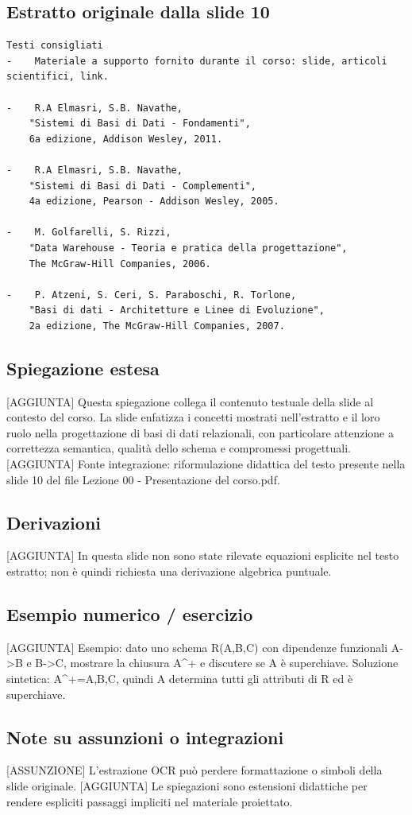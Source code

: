 \documentclass[11pt]{article}
\begin{document}
\subsection*{Estratto originale dalla slide 10}
\begin{lstlisting}
Testi consigliati
-    Materiale a supporto fornito durante il corso: slide, articoli scientifici, link.

-    R.A Elmasri, S.B. Navathe,
    "Sistemi di Basi di Dati - Fondamenti",
    6a edizione, Addison Wesley, 2011.

-    R.A Elmasri, S.B. Navathe,
    "Sistemi di Basi di Dati - Complementi",
    4a edizione, Pearson - Addison Wesley, 2005.

-    M. Golfarelli, S. Rizzi,
    "Data Warehouse - Teoria e pratica della progettazione",
    The McGraw-Hill Companies, 2006.

-    P. Atzeni, S. Ceri, S. Paraboschi, R. Torlone,
    "Basi di dati - Architetture e Linee di Evoluzione",
    2a edizione, The McGraw-Hill Companies, 2007.
\end{lstlisting}
\subsection*{Spiegazione estesa}
[AGGIUNTA] Questa spiegazione collega il contenuto testuale della slide al contesto del corso. La slide enfatizza i concetti mostrati nell'estratto e il loro ruolo nella progettazione di basi di dati relazionali, con particolare attenzione a correttezza semantica, qualità dello schema e compromessi progettuali.
[AGGIUNTA] Fonte integrazione: riformulazione didattica del testo presente nella slide 10 del file Lezione 00 - Presentazione del corso.pdf.
\subsection*{Derivazioni}
[AGGIUNTA] In questa slide non sono state rilevate equazioni esplicite nel testo estratto; non è quindi richiesta una derivazione algebrica puntuale.
\subsection*{Esempio numerico / esercizio}
[AGGIUNTA] Esempio: dato uno schema R(A,B,C) con dipendenze funzionali A->B e B->C, mostrare la chiusura A^+ e discutere se A è superchiave. Soluzione sintetica: A^+={A,B,C}, quindi A determina tutti gli attributi di R ed è superchiave.
\subsection*{Note su assunzioni o integrazioni}
[ASSUNZIONE] L'estrazione OCR può perdere formattazione o simboli della slide originale.
[AGGIUNTA] Le spiegazioni sono estensioni didattiche per rendere espliciti passaggi impliciti nel materiale proiettato.
\end{document}
